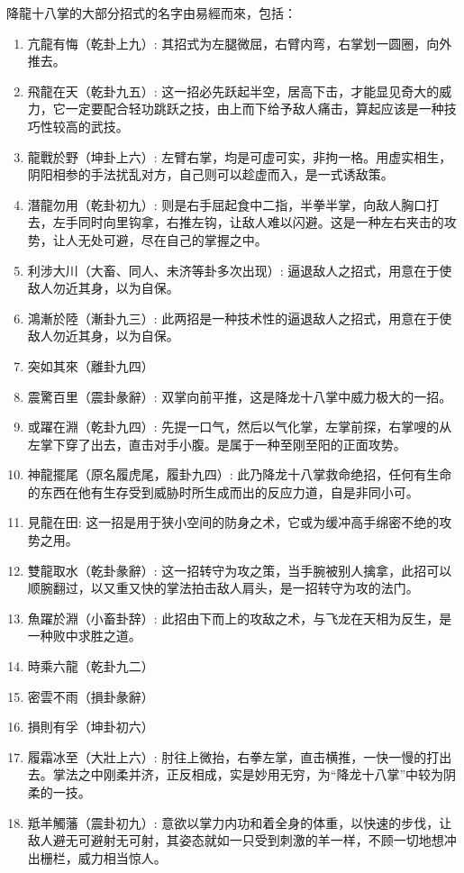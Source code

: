 降龍十八掌的大部分招式的名字由易經而來，包括：
\begin{enumerate}
\item 亢龍有悔（乾卦上九）: 其招式为左腿微屈，右臂内弯，右掌划一圆圈，向外推去。
\item 飛龍在天（乾卦九五）: 这一招必先跃起半空，居高下击，才能显见奇大的威力，它一定要配合轻功跳跃之技，由上而下给予敌人痛击，算起应该是一种技巧性较高的武技。
\item 龍戰於野（坤卦上六）: 左臂右掌，均是可虚可实，非拘一格。用虚实相生，阴阳相参的手法扰乱对方，自己则可以趁虚而入，是一式诱敌策。
\item 潛龍勿用（乾卦初九）: 则是右手屈起食中二指，半拳半掌，向敌人胸口打去，左手同时向里钩拿，右推左钩，让敌人难以闪避。这是一种左右夹击的攻势，让人无处可避，尽在自己的掌握之中。
\item 利涉大川（大畜、同人、未济等卦多次出现）: 逼退敌人之招式，用意在于使敌人勿近其身，以为自保。
\item 鴻漸於陸（漸卦九三）: 此两招是一种技术性的逼退敌人之招式，用意在于使敌人勿近其身，以为自保。
\item 突如其來（離卦九四）
\item 震驚百里（震卦彖辭）: 双掌向前平推，这是降龙十八掌中威力极大的一招。
\item 或躍在淵（乾卦九四）: 先提一口气，然后以气化掌，左掌前探，右掌嗖的从左掌下穿了出去，直击对手小腹。是属于一种至刚至阳的正面攻势。
\item 神龍擺尾（原名履虎尾，履卦九四）: 此乃降龙十八掌救命绝招，任何有生命的东西在他有生存受到威胁时所生成而出的反应力道，自是非同小可。
\item 見龍在田: 这一招是用于狭小空间的防身之术，它或为缓冲高手绵密不绝的攻势之用。
\item 雙龍取水（乾卦彖辭）: 这一招转守为攻之策，当手腕被别人擒拿，此招可以顺腕翻过，以又重又快的掌法拍击敌人肩头，是一招转守为攻的法门。
\item 魚躍於淵（小畜卦辞）: 此招由下而上的攻敌之术，与飞龙在天相为反生，是一种败中求胜之道。
\item 時乘六龍（乾卦九二）
\item 密雲不雨（損卦彖辭）
\item 損則有孚（坤卦初六）
\item 履霜冰至（大壯上六）: 肘往上微抬，右拳左掌，直击横推，一快一慢的打出去。掌法之中刚柔并济，正反相成，实是妙用无穷，为“降龙十八掌”中较为阴柔的一技。
\item 羝羊觸藩（震卦初九）: 意欲以掌力内功和着全身的体重，以快速的步伐，让敌人避无可避射无可射，其姿态就如一只受到刺激的羊一样，不顾一切地想冲出栅栏，威力相当惊人。
\end{enumerate}

